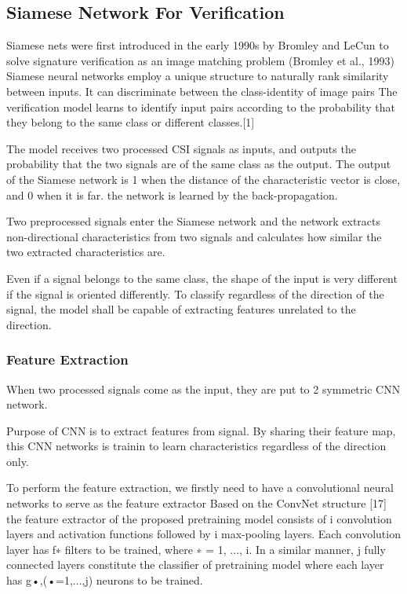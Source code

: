 \documentclass[runningheads]{llncs}
\begin{document}

\subsection{Siamese Network For Verification}

Siamese nets were first introduced in the early 1990s by Bromley and LeCun to solve signature verification as an image matching problem (Bromley et al., 1993)
Siamese neural networks employ a unique structure to naturally rank similarity between inputs.
It can discriminate between the class-identity of image pairs
The verification model learns to identify input pairs according to the probability that they belong to the same class or different classes.[1]

The model receives two processed CSI signals as inputs, and outputs the probability that the two signals are of the same class as the output. 
The output of the Siamese network is 1 when the distance of the characteristic vector is close, and 0 when it is far.
the network is learned by the back-propagation.

Two preprocessed signals enter the Siamese network and the network extracts non-directional characteristics from two signals and calculates how similar the two extracted characteristics are.

Even if a signal belongs to the same class, the shape of the input is very different if the signal is oriented differently.
To classify regardless of the direction of the signal, the model shall be capable of extracting features unrelated to the direction.


\subsubsection{Feature Extraction}
When two processed signals come as the input, they are put to 2 symmetric CNN network.

Purpose of CNN is to extract features from signal.
By sharing their feature map, this CNN networks is trainin to learn characteristics regardless of the direction only.

To perform the feature extraction, we firstly need to have a convolutional neural networks  to serve as the feature extractor
Based on the ConvNet structure [17] the feature extractor of the proposed pretraining model consists of i convolution layers and activation functions followed by i max-pooling layers. Each convolution layer has f∗ filters to be trained, where ∗ = 1, ..., i. In a similar manner, j fully connected layers constitute the classifier of pretraining model where each layer has g•,(•=1,...,j) neurons to be trained. 
\end{document}
